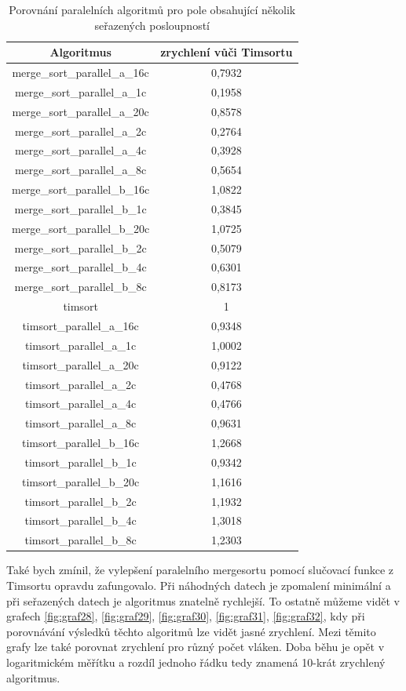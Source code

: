 \documentclass[thesis=B,czech]{FITthesis}[2019/12/23]
\begin{document}
 \begin{table}[htbp]\centering
 	\caption[Porovnání paralelních algoritmů pro pole obsahující několik seřazených posloupností]{Porovnání paralelních algoritmů pro pole obsahující několik seřazených posloupností}\label{tab:tab5}
 	\begin{tabular}{|c|c|}\hline \hline
 		Algoritmus		& zrychlení vůči Timsortu \tabularnewline \hline \hline
merge\_sort\_parallel\_a\_16c & 0,7932\tabularnewline \hline
merge\_sort\_parallel\_a\_1c & 0,1958\tabularnewline \hline
merge\_sort\_parallel\_a\_20c & 0,8578\tabularnewline \hline
merge\_sort\_parallel\_a\_2c & 0,2764\tabularnewline \hline
merge\_sort\_parallel\_a\_4c & 0,3928\tabularnewline \hline
merge\_sort\_parallel\_a\_8c & 0,5654\tabularnewline \hline
merge\_sort\_parallel\_b\_16c & 1,0822\tabularnewline \hline
merge\_sort\_parallel\_b\_1c & 0,3845\tabularnewline \hline
merge\_sort\_parallel\_b\_20c & 1,0725\tabularnewline \hline
merge\_sort\_parallel\_b\_2c & 0,5079\tabularnewline \hline
merge\_sort\_parallel\_b\_4c & 0,6301\tabularnewline \hline
merge\_sort\_parallel\_b\_8c & 0,8173\tabularnewline \hline
timsort & 1\tabularnewline \hline
timsort\_parallel\_a\_16c & 0,9348\tabularnewline \hline
timsort\_parallel\_a\_1c & 1,0002\tabularnewline \hline
timsort\_parallel\_a\_20c & 0,9122\tabularnewline \hline
timsort\_parallel\_a\_2c & 0,4768\tabularnewline \hline
timsort\_parallel\_a\_4c & 0,4766\tabularnewline \hline
timsort\_parallel\_a\_8c & 0,9631\tabularnewline \hline
timsort\_parallel\_b\_16c & 1,2668\tabularnewline \hline
timsort\_parallel\_b\_1c & 0,9342\tabularnewline \hline
timsort\_parallel\_b\_20c & 1,1616\tabularnewline \hline
timsort\_parallel\_b\_2c & 1,1932\tabularnewline \hline
timsort\_parallel\_b\_4c & 1,3018\tabularnewline \hline
timsort\_parallel\_b\_8c & 1,2303\tabularnewline \hline




	\end{tabular}
\end{table}
Také bych zmínil, že vylepšení paralelního mergesortu pomocí slučovací funkce z Timsortu opravdu zafungovalo. Při náhodných datech je zpomalení minimální a při seřazených datech je algoritmus znatelně rychlejší. To ostatně můžeme vidět v grafech \ref{fig:graf28}, \ref{fig:graf29}, \ref{fig:graf30}, \ref{fig:graf31}, \ref{fig:graf32}, kdy při porovnávání výsledků těchto algoritmů lze vidět jasné zrychlení. Mezi těmito grafy lze také porovnat zrychlení pro různý počet vláken. Doba běhu je opět v logaritmickém měřítku a rozdíl jednoho řádku tedy znamená 10-krát zrychlený algoritmus.
\end{document}
